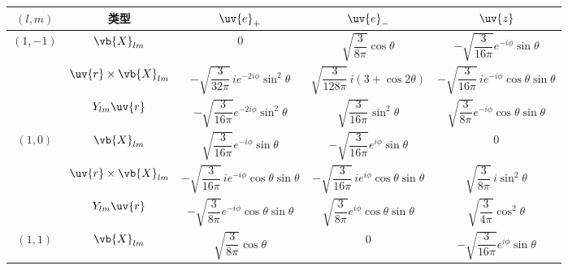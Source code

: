 \begingroup
\small
\newpage
\begin{longtable}{ccccc}
	\toprule[1pt]
	\((l,m)\) & 类型                          & \(\uv{e}_+\)                                                                     & \(\uv{e}_-\)                                                                 & \(\uv{z}\)                                                           \\
	\midrule[0.6pt]
	\multirow{3}{*}{\((1,-1)\)}
	          & \(\vb{X}_{lm}\)             & \(0\)                                                                            & \(\sqrt{\dfrac{3}{8\pi}} \cos\theta\)                                        & \(-\sqrt{\dfrac{3}{16\pi}} e^{-i\phi} \sin\theta\)                   \\
	\cmidrule(lr){2-5}
	          & \(\uv{r}\times\vb{X}_{lm}\) & \(-\sqrt{\dfrac{3}{32\pi}} \, i e^{-2i\phi} \sin^2\theta\)                       & \(\sqrt{\dfrac{3}{128\pi}} \, i \left(3+\cos2\theta\right)\)                 & \(-\sqrt{\dfrac{3}{16\pi}} \, i e^{-i\phi} \cos\theta\sin\theta\)    \\
	\cmidrule(lr){2-5}
	          & \(Y_{lm}\uv{r}\)            & \(-\sqrt{\dfrac{3}{16\pi}} e^{-2i\phi} \sin^2\theta\)                            & \(\sqrt{\dfrac{3}{16\pi}} \sin^2\theta\)                                     & \(\sqrt{\dfrac{3}{8\pi}} e^{-i\phi} \cos\theta\sin\theta\)           \\
	\midrule
	\multirow{3}{*}{\((1,0)\)}
	          & \(\vb{X}_{lm}\)             & \(\sqrt{\dfrac{3}{16\pi}} e^{-i\phi} \sin\theta\)                                & \(-\sqrt{\dfrac{3}{16\pi}} e^{i\phi} \sin\theta\)                            & \(0\)                                                                \\
	\cmidrule(lr){2-5}
	          & \(\uv{r}\times\vb{X}_{lm}\) & \(-\sqrt{\dfrac{3}{16\pi}} \, i e^{-i\phi} \cos\theta\sin\theta\)                & \(-\sqrt{\dfrac{3}{16\pi}} \, i e^{i\phi} \cos\theta\sin\theta\)             & \(\sqrt{\dfrac{3}{8\pi}} \, i \sin^2\theta\)                         \\
	\cmidrule(lr){2-5}
	          & \(Y_{lm}\uv{r}\)            & \(-\sqrt{\dfrac{3}{8\pi}} e^{-i\phi} \cos\theta\sin\theta\)                      & \(\sqrt{\dfrac{3}{8\pi}} e^{i\phi} \cos\theta\sin\theta\)                    & \(\sqrt{\dfrac{3}{4\pi}} \cos^2\theta\)                              \\
	\midrule
	\multirow{3}{*}{\((1,1)\)}
	          & \(\vb{X}_{lm}\)             & \(\sqrt{\dfrac{3}{8\pi}} \cos\theta\)                                            & \(0\)                                                                        & \(-\sqrt{\dfrac{3}{16\pi}} e^{i\phi} \sin\theta\)                    \\

\end{longtable}
